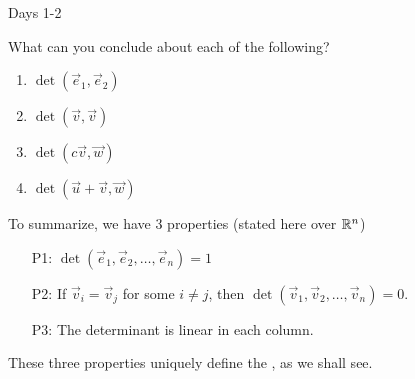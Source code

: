 \begin{applicationActivities}{Days 1-2}
\begin{activity}
\begin{minipage}{0.8\textwidth}
\begin{multicols}{2}
\begin{center}
\end{center}

\begin{center}
\end{center}

\end{multicols}
\end{minipage}

\end{activity}

\begin{activity}
What can you conclude about each of the following?
\begin{enumerate}
\item $\det(\vec{e}_1,\vec{e}_2)$
\item $\det(\vec{v},\vec{v})$
\item $\det(c\vec{v},\vec{w})$
\item $\det(\vec{u}+\vec{v},\vec{w})$
\end{enumerate}
\end{activity}


\begin{definition}
To summarize, we have 3 properties (stated here over $\mathbb{R}^n$)
\begin{enumerate}
\item [P1:] $\det(\vec{e}_1,\vec{e}_2,\ldots,\vec{e}_n)=1$
\item [P2:] If $\vec{v}_i = \vec{v}_j$ for some $i \neq j$, then $\det(\vec{v}_1,\vec{v}_2,\ldots,\vec{v}_n)=0$.
\item[P3:] The determinant is linear in each column.
\end{enumerate}

These three properties uniquely define the , as we shall see.
\end{definition}


\end{applicationActivities}
